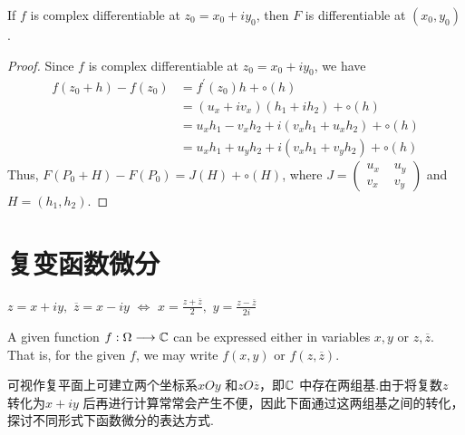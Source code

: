 \vspace{2em}
\begin{proposition}\label{prop 2.4.1}
	If $f$ is complex differentiable at $z_0 = x_0 + i y_0$, then $F$ is differentiable at $(x_0 , y_0)$.
	
	\vspace{2em}
	\begin{proof}
		Since $f$ is complex differentiable at $z_0 = x_0 + i y_0$, we have
		\begin{align}
			f(z_0 + h) - f(z_0) 
			&= f^{'}(z_0)h + \circ(h) \\
			&= (u_x + i v_x)(h_1 + i h_2) + \circ(h) \\
			&= u_x h_1 - v_x h_2 + i (v_x h_1 + u_x h_2) + \circ(h) \\
			&= u_x h_1 + u_y h_2 + i (v_x h_1 + v_y h_2) + \circ(h)
		\end{align}
		Thus, $F(P_0 + H) - F(P_0) = J(H) + \circ(H)$, where $J = 
		\begin{pmatrix}
			u_x \,\, &u_y \\
			v_x &v_y
		\end{pmatrix}$ and $H = (h_1 , h_2)$.
	\end{proof}
\end{proposition}

\newpage
\section{复变函数微分}
\begin{center}
	$z = x + i y , \,\, \overline{z} = x - i y \,\, \Leftrightarrow \,\, x = \frac{z + \overline{z}}{2} , \,\, y = \frac{z - \overline{z}}{2i}$
\end{center}
A given function $f : \Omega \longrightarrow \mathbb{C}$ can be expressed either in variables $x , y$ or $z , \overline{z}$. That is, for the given $f$, we may write $f(x , y)$ or $f(z , \overline{z})$.
\begin{rmk}
	可视作复平面上可建立两个坐标系$xOy$ 和$zO\overline{z}$，即$\mathbb{C}$ 中存在两组基.由于将复数$z$ 转化为$x + i y$ 后再进行计算常常会产生不便，因此下面通过这两组基之间的转化，探讨不同形式下函数微分的表达方式.
\end{rmk}

